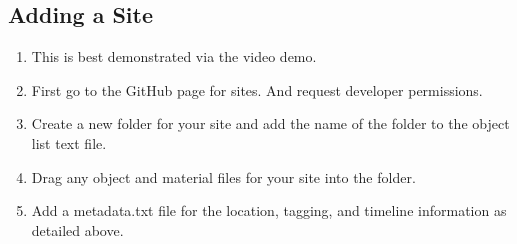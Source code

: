 \documentclass{article}
\begin{document}
\subsection{Adding a Site}
\begin{enumerate}
    \item This is best demonstrated via the video demo.
    \item First go to the GitHub page for sites. And request  developer permissions.
    \item Create a new folder for your site and add the name of the folder to the object list text file.
    \item Drag any object and material files for your site into the folder.
    \item Add a metadata.txt file for the location, tagging, and timeline information as detailed above.
\end{enumerate}
\end{document}
